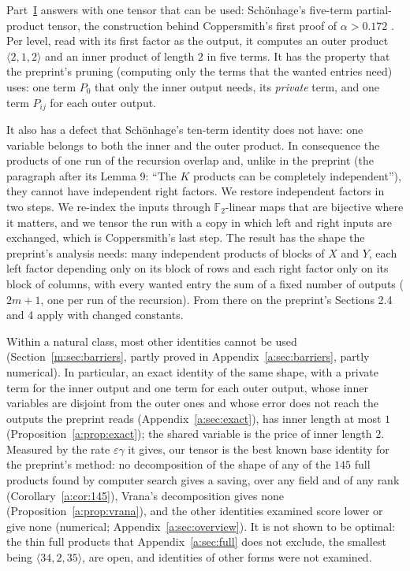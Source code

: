 \documentclass[11pt]{article}
\theoremstyle{definition}
\theoremstyle{remark}
\newcommand{\F}{\mathbb{F}_2}
\begin{document}
Part~\hyperref[m:partI]{I} answers with one tensor that can be used: Schönhage's five-term partial-product tensor, the construction behind Coppersmith's first proof of $\alpha>0.172$ \cite[p.~467]{Cop82}. Per level, read with its first factor as the output, it computes an outer product $\langle2,1,2\rangle$ and an inner product of length $2$ in five terms. It has the property that the preprint's pruning (computing only the terms that the wanted entries need) uses: one term $P_0$ that only the inner output needs, its \emph{private} term, and one term $P_{ij}$ for each outer output.

It also has a defect that Schönhage's ten-term identity does not have: one variable belongs to both the inner and the outer product. In consequence the products of one run of the recursion overlap and, unlike in the preprint (the paragraph after its Lemma 9: ``The $K$ products can be completely independent''), they cannot have independent right factors. We restore independent factors in two steps. We re-index the inputs through $\F$-linear maps that are bijective where it matters, and we tensor the run with a copy in which left and right inputs are exchanged, which is Coppersmith's last step. The result has the shape the preprint's analysis needs: many independent products of blocks of $X$ and $Y$, each left factor depending only on its block of rows and each right factor only on its block of columns, with every wanted entry the sum of a fixed number of outputs ($2m+1$, one per run of the recursion). From there on the preprint's Sections 2.4 and 4 apply with changed constants.

Within a natural class, most other identities cannot be used (Section~\ref{m:sec:barriers}, partly proved in Appendix~\ref{a:sec:barriers}, partly numerical). In particular, an exact identity of the same shape, with a private term for the inner output and one term for each outer output, whose inner variables are disjoint from the outer ones and whose error does not reach the outputs the preprint reads (Appendix~\ref{a:sec:exact}), has inner length at most $1$ (Proposition~\ref{a:prop:exact}); the shared variable is the price of inner length $2$. Measured by the rate $\varepsilon\gamma$ it gives, our tensor is the best known base identity for the preprint's method: no decomposition of the shape of any of the $145$ full products found by computer search gives a saving, over any field and of any rank (Corollary~\ref{a:cor:145}), Vrana's decomposition gives none (Proposition~\ref{a:prop:vrana}), and the other identities examined score lower or give none (numerical; Appendix~\ref{a:sec:overview}). It is not shown to be optimal: the thin full products that Appendix~\ref{a:sec:full} does not exclude, the smallest being $\langle34,2,35\rangle$, are open, and identities of other forms were not examined.
\end{document}
